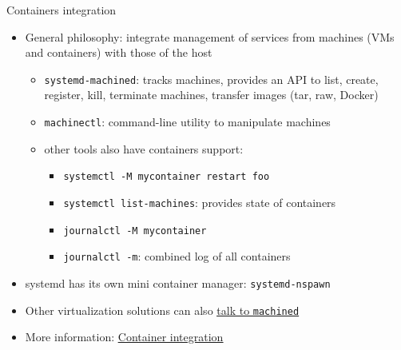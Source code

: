 \documentclass[11pt,final,usepdftitle=false]{beamer}
\begin{document}
\begin{frame}{Containers integration}
\begin{itemize}
	\item General philosophy: \alert{integrate management of services from machines (VMs and containers) with those of the host}
	\begin{itemize}
		\item \texttt{systemd-machined}: tracks machines, provides an API to list, create, register, kill, terminate machines, transfer images (tar, raw, Docker)
			\hbr
		\item \texttt{machinectl}: command-line utility to manipulate machines
			\hbr
		\item other tools also have containers support:
			\begin{itemize}
				\item \texttt{systemctl -M mycontainer restart foo}
				\item \texttt{systemctl list-machines}: provides state of containers
				\item \texttt{journalctl -M mycontainer}
				\item \texttt{journalctl -m}: combined log of all containers
			\end{itemize}
	\end{itemize}
\hbr
\item systemd has its own mini container manager: \texttt{systemd-nspawn}
\hbr
\item Other virtualization solutions can also \href{http://www.freedesktop.org/wiki/Software/systemd/machined/}{\ul{talk to \texttt{machined}}}
\hbr
\item More information: \href{http://0pointer.net/blog/systemd-for-administrators-part-xxi.html}{\ul{Container integration}}
\end{itemize}
\end{frame}
\end{document}

